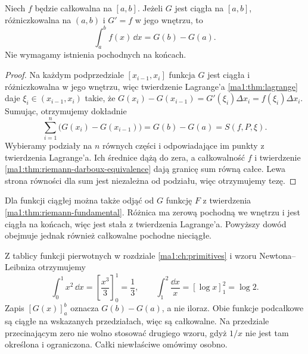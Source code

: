 \begin{twierdzenie}
\label{ma1:thm:newton-leibniz}
Niech $f$ będzie całkowalna na $[a,b]$. Jeżeli $G$ jest ciągła na $[a,b]$, różniczkowalna na $(a,b)$ i $G'=f$ w jego wnętrzu, to
\[
 \int_a^b f(x)\,\dd x=G(b)-G(a).
\]
Nie wymagamy istnienia pochodnych na końcach.
\end{twierdzenie}
\begin{proof}
Na każdym podprzedziale $[x_{i-1},x_i]$ funkcja $G$ jest ciągła i różniczkowalna w jego wnętrzu, więc twierdzenie Lagrange'a \ref{ma1:thm:lagrange} daje $\xi_i\in(x_{i-1},x_i)$ takie, że $G(x_i)-G(x_{i-1})=G'(\xi_i)\Delta x_i=f(\xi_i)\Delta x_i$. Sumując, otrzymujemy dokładnie
\[
 \sum_{i=1}^n\bigl(G(x_i)-G(x_{i-1})\bigr)
 =G(b)-G(a)=S(f,P,\xi).
\] Wybieramy podziały na $n$ równych części i odpowiadające im punkty z twierdzenia Lagrange'a. Ich średnice dążą do zera, a całkowalność $f$ i twierdzenie \ref{ma1:thm:riemann-darboux-equivalence} dają granicę sum równą całce. Lewa strona równości dla sum jest niezależna od podziału, więc otrzymujemy tezę.
\end{proof}
Dla funkcji ciągłej można także odjąć od $G$ funkcję $F$ z twierdzenia \ref{ma1:thm:riemann-fundamental}. Różnica ma zerową pochodną we wnętrzu i jest ciągła na końcach, więc jest stała z twierdzenia Lagrange'a. Powyższy dowód obejmuje jednak również całkowalne pochodne nieciągłe.

\begin{przyklad}
\label{ma1:ex:riemann-newton-leibniz}
Z tablicy funkcji pierwotnych w rozdziale \ref{ma1:ch:primitives} i wzoru Newtona--Leibniza otrzymujemy
\[
 \int_0^1 x^2\,\dd x=\left[\frac{x^3}{3}\right]_0^1=\frac13,\qquad
 \int_1^2\frac{\dd x}{x}=[\log x]_1^2=\log2.
\]
Zapis $[G(x)]_a^b$ oznacza $G(b)-G(a)$, a nie iloraz. Obie funkcje podcałkowe są ciągłe na wskazanych przedziałach, więc są całkowalne. Na przedziale przecinającym zero nie wolno stosować drugiego wzoru, gdyż $1/x$ nie jest tam określona i ograniczona. Całki niewłaściwe omówimy osobno.
\end{przyklad}


